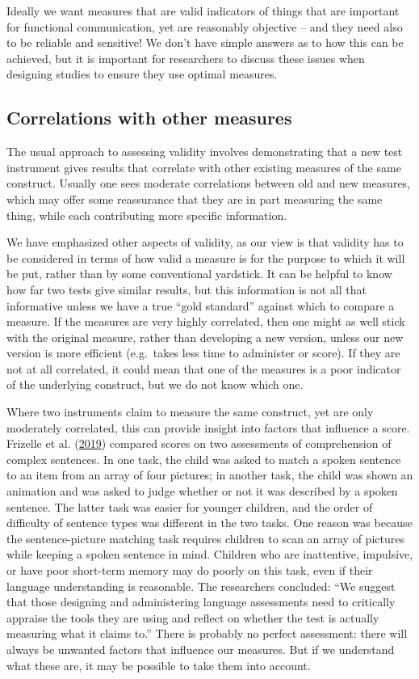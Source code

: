 \documentclass{krantz}
\begin{document}
Ideally we want measures that are valid indicators of things that are important for functional communication, yet are reasonably objective -- and they need also to be reliable and sensitive! We don't have simple answers as to how this can be achieved, but it is important for researchers to discuss these issues when designing studies to ensure they use optimal measures.

\hypertarget{correlations-with-other-measures}{%
\subsection{Correlations with other measures}\label{correlations-with-other-measures}}

The usual approach to assessing validity involves demonstrating that a new test instrument gives results that correlate with other existing measures of the same construct. Usually one sees moderate correlations between old and new measures, which may offer some reassurance that they are in part measuring the same thing, while each contributing more specific information.

We have emphasized other aspects of validity, as our view is that validity has to be considered in terms of how valid a measure is for the purpose to which it will be put, rather than by some conventional yardstick. It can be helpful to know how far two tests give similar results, but this information is not all that informative unless we have a true ``gold standard'' against which to compare a measure. If the measures are very highly correlated, then one might as well stick with the original measure, rather than developing a new version, unless our new version is more efficient (e.g.~takes less time to administer or score). If they are not at all correlated, it could mean that one of the measures is a poor indicator of the underlying construct, but we do not know which one.

Where two instruments claim to measure the same construct, yet are only moderately correlated, this can provide insight into factors that influence a score. Frizelle et al. (\protect\hyperlink{ref-frizelle2019}{2019}) compared scores on two assessments of comprehension of complex sentences. In one task, the child was asked to match a spoken sentence to an item from an array of four pictures; in another task, the child was shown an animation and was asked to judge whether or not it was described by a spoken sentence. The latter task was easier for younger children, and the order of difficulty of sentence types was different in the two tasks. One reason was because the sentence-picture matching task requires children to scan an array of pictures while keeping a spoken sentence in mind. Children who are inattentive, impulsive, or have poor short-term memory may do poorly on this task, even if their language understanding is reasonable. The researchers concluded: ``We suggest that those designing and administering language assessments need to critically appraise the tools they are using and reflect on whether the test is actually measuring what it claims to.'' There is probably no perfect assessment: there will always be unwanted factors that influence our measures. But if we understand what these are, it may be possible to take them into account.
\end{document}
